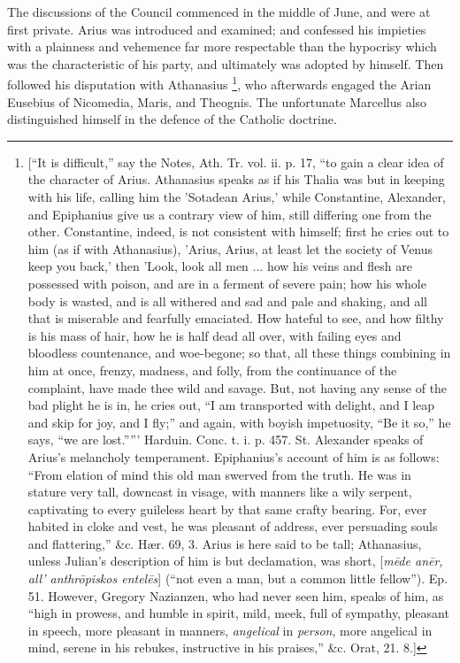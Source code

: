 The discussions of the Council commenced in the middle of June, and
were at first private. Arius was introduced and examined; and
confessed his impieties with a plainness and vehemence far more
respectable than the hypocrisy which was the characteristic of his
party, and ultimately was adopted by himself. Then followed his
disputation with Athanasius \footnote{[``It is difficult,'' say the
Notes, Ath. Tr. vol. ii. p. 17, ``to gain a clear idea of the
character of Arius. Athanasius speaks as if his Thalia was but in
keeping with his life, calling him the 'Sotadean Arius,' while
Constantine, Alexander, and Epiphanius give us a contrary view of him,
still differing one from the other. Constantine, indeed, is not
consistent with himself; first he cries out to him (as if with
Athanasius), 'Arius, Arius, at least let the society of Venus keep you
back,' then 'Look, look all men ... how his veins and flesh are
possessed with poison, and are in a ferment of severe pain; how his
whole body is wasted, and is all withered and sad and pale and
shaking, and all that is miserable and fearfully emaciated. How
hateful to see, and how filthy is his mass of hair, how he is half
dead all over, with failing eyes and bloodless countenance, and woe-begone;
so that, all these things combining in him at once, frenzy, madness,
and folly, from the continuance of the complaint, have made thee wild
and savage. But, not having any sense of the bad plight he is in, he
cries out, ``I am transported with delight, and I leap and skip
for joy, and I fly;'' and again, with boyish impetuosity, ``Be
it so,'' he says, ``we are lost.''''' Harduin. Conc.
t. i. p. 457. St. Alexander speaks of Arius's melancholy temperament.
Epiphanius's account of him is as follows: ``From elation of mind
this old man swerved from the truth. He was in stature very tall,
downcast in visage, with manners like a wily serpent, captivating to
every guileless heart by that same crafty bearing. For, ever habited
in cloke and vest, he was pleasant of address, ever persuading souls
and flattering,'' \&c. Hær. 69, 3. Arius is here said to be
tall; Athanasius, unless Julian's description of him is but
declamation, was short, [\emph{m\={e}de an\={e}r, all' anthr\={o}piskos
entel\={e}s}] (``not even a man, but a common little
fellow''). Ep. 51. However, Gregory Nazianzen, who had never seen
him, speaks of him, as ``high in prowess, and humble in spirit,
mild, meek, full of sympathy, pleasant in speech, more pleasant in
manners, \emph{angelical} in \emph{person}, more angelical in mind,
serene in his rebukes, instructive in his praises,'' \&c. Orat,
21. 8.]},
who afterwards engaged the Arian Eusebius of Nicomedia, Maris,
and Theognis. The unfortunate Marcellus also distinguished himself in
the defence of the Catholic doctrine.

